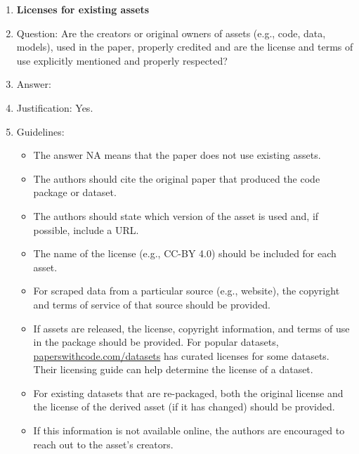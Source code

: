 \documentclass{article}
\begin{document}
\begin{enumerate}
\item {\bf Licenses for existing assets}
    \item[] Question: Are the creators or original owners of assets (e.g., code, data, models), used in the paper, properly credited and are the license and terms of use explicitly mentioned and properly respected?
    \item[] Answer: \answerYes{} %
    \item[] Justification: Yes.
    \item[] Guidelines:
    \begin{itemize}
        \item The answer NA means that the paper does not use existing assets.
        \item The authors should cite the original paper that produced the code package or dataset.
        \item The authors should state which version of the asset is used and, if possible, include a URL.
        \item The name of the license (e.g., CC-BY 4.0) should be included for each asset.
        \item For scraped data from a particular source (e.g., website), the copyright and terms of service of that source should be provided.
        \item If assets are released, the license, copyright information, and terms of use in the package should be provided. For popular datasets, \url{paperswithcode.com/datasets} has curated licenses for some datasets. Their licensing guide can help determine the license of a dataset.
        \item For existing datasets that are re-packaged, both the original license and the license of the derived asset (if it has changed) should be provided.
        \item If this information is not available online, the authors are encouraged to reach out to the asset's creators.
    \end{itemize}


\end{enumerate}
\end{document}
